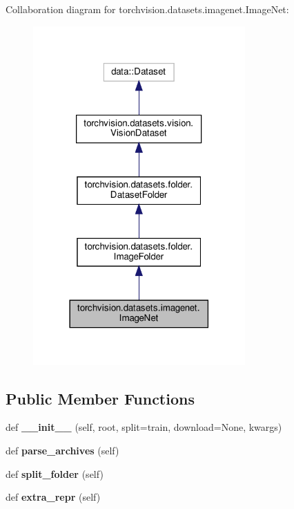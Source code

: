 Collaboration diagram for torchvision.\+datasets.\+imagenet.\+Image\+Net\+:
\nopagebreak
\begin{figure}[H]
\begin{center}
\leavevmode
\includegraphics[width=230pt]{classtorchvision_1_1datasets_1_1imagenet_1_1ImageNet__coll__graph}
\end{center}
\end{figure}
\subsection*{Public Member Functions}
\begin{DoxyCompactItemize}
\item 
\mbox{\label{classtorchvision_1_1datasets_1_1imagenet_1_1ImageNet_a08b71630383b7f7031ee13ce311a0966}} 
def {\bfseries \+\_\+\+\_\+init\+\_\+\+\_\+} (self, root, split=\textquotesingle{}train\textquotesingle{}, download=None, kwargs)
\item 
\mbox{\label{classtorchvision_1_1datasets_1_1imagenet_1_1ImageNet_a945ec1e0fdd6fbac5eeb8eb5e787c57e}} 
def {\bfseries parse\+\_\+archives} (self)
\item 
\mbox{\label{classtorchvision_1_1datasets_1_1imagenet_1_1ImageNet_a881a61219ae1bc809df32bbd9c5da8ca}} 
def {\bfseries split\+\_\+folder} (self)
\item 
\mbox{\label{classtorchvision_1_1datasets_1_1imagenet_1_1ImageNet_a20ccce453fd745342c5bca1b8b9a7003}} 
def {\bfseries extra\+\_\+repr} (self)
\end{DoxyCompactItemize}

